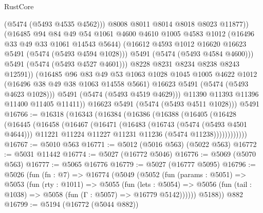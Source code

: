 \begin{lexlean}{RustCore}
\begin{coremodule}
                        (@5474 (@5493 @4535 @4562)))
                      @8008
                      @8011
                      @8014
                      @8018
                      @8023
                      @11877))
                  (@16485
                    @94
                    @84
                    @49
                    @54
                    @1061
                    @4600
                    @4610
                    @1005
                    @4583
                    @1012
                    (@16496 @33 @49 @33 @1061 @14543 @5644)
                    (@16612 @4593 @1012 @16620 @16623 @5491 (@5474 (@5493 @4594 @1028)))
                    @5491
                    (@5474 (@5493 @4584 @4600)))
                  @5491
                  (@5474 (@5493 @4527 @4601)))
                @8228
                @8231
                @8234
                @8238
                @8243
                @12591))
            (@16485
              @96
              @83
              @49
              @53
              @1063
              @1028
              @1045
              @1005
              @4622
              @1012
              (@16496 @38 @49 @38 @1063 @14558 @5661)
              @16623
              @5491
              (@5474 (@5493 @4623 @1028)))
            @5491
            (@5474 (@5493 @4519 @4629)))
          @11390
          @11393
          @11396
          @11400
          @11405
          @11411))
      @16623
      @5491
      (@5474 (@5493 @4511 @1028)))
    @5491
@16766 := @16318
    (@16343
      (@16384
        (@16386
          (@16388
            (@16405
              (@16428
                (@16445
                  (@16458
                    (@16467
                      (@16471
                        (@16483
                          (@16743 (@5474 (@5493 @4501 @4644)))
                          @11221
                          @11224
                          @11227
                          @11231
                          @11236
                          (@5474 @11238))))))))))))
@16767 := @5010 @563
@16771 := @5012 (@5016 @563) (@5022 @563)
@16772 := @5031 @11442
@16774 := @5027 (@16772 @5046)
@16776 := @5069 (@5070 @563)
@16777 := @5065 @16776
@16779 := @5027 (@16777 @5095)
@16796 := @5026
    (fun (fn : @7) =>
    @16774
      (@5049
        (@5052
          (fun (params : @5051) =>
          @5053
            (fun (rty : @1011) =>
            @5055
              (fun (lets : @5054) =>
              @5056 (fun (tail : @1038) => @5058 (fun (Γ : @5057) => @16779 @5142))))))
        @5188))
    @882
@16799 := @5194 (@16772 (@5044 @882))

\end{coremodule}
\end{lexlean}
